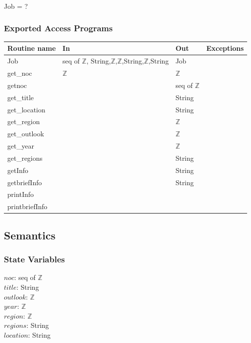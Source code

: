 \documentclass[12pt]{article}
\begin{document}
Job = ?

\subsubsection* {Exported Access Programs}

\begin{tabular}{| l | l | l | l |}
\hline
\textbf{Routine name} & \textbf{In} & \textbf{Out} & \textbf{Exceptions}\\
\hline
Job & seq of $\mathbb{Z}$, String,$\mathbb{Z}$,$\mathbb{Z}$,String,$\mathbb{Z}$,String  & Job & \\
\hline
get\_noc & $\mathbb{Z}$ & $\mathbb{Z}$ &\\
\hline
getnoc & ~ & seq of $\mathbb{Z}$ &\\
\hline
get\_title & ~ & String &\\
\hline
get\_location & ~ & String &\\
\hline
get\_region & ~ & $\mathbb{Z}$ &\\
\hline
get\_outlook & ~ & $\mathbb{Z}$ &\\
\hline
get\_year & ~ & $\mathbb{Z}$ &\\
\hline
get\_regions & ~ & String &\\
\hline
getInfo & ~ & String &\\
\hline
getbriefInfo & ~ & String &\\
\hline
printInfo & ~ &~ &\\
\hline
printbriefInfo & ~ &~ &\\
\hline
\end{tabular}

\subsection* {Semantics}

\subsubsection* {State Variables}

$noc$: seq of $\mathbb{Z}$\\
$title$: String\\
$outlook$: $\mathbb{Z}$\\
$year$: $\mathbb{Z}$\\
$region$: $\mathbb{Z}$\\
$regions$: String\\
$location$: String\\
\end{document}
